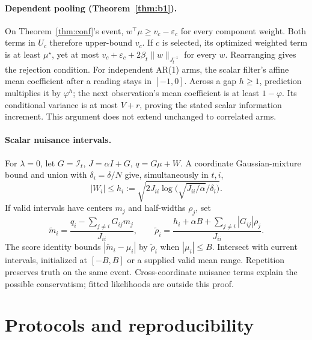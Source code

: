 \documentclass[sigconf,review,anonymous]{acmart}
\newcommand{\I}{\mathcal{I}}
\begin{document}
\paragraph{Dependent pooling (Theorem~\ref{thm:b1}).}
On Theorem~\ref{thm:conf}'s event, $w^\top\mu\ge v_c-\varepsilon_c$ for every component weight. Both terms in $U_c$ therefore upper-bound $v_c$. If $c$ is selected, its optimized weighted term is at least $\mu^\star$, yet at most $v_c+\varepsilon_c+2\beta_t\|w\|_{J_t^{-1}}$ for every $w$. Rearranging gives the rejection condition. For independent AR(1) arms, the scalar filter's affine mean coefficient after a reading stays in $[-1,0]$. Across a gap $h\ge1$, prediction multiplies it by $\varphi^h$; the next observation's mean coefficient is at least $1-\varphi$. Its conditional variance is at most $V+r$, proving the stated scalar information increment. This argument does not extend unchanged to correlated arms.

\paragraph{Scalar nuisance intervals.}
For $\lambda=0$, let $G=\I_t$, $J=\alpha I+G$, $q=G\mu+W$. A coordinate Gaussian-mixture bound and union with $\delta_i=\delta/N$ give, simultaneously in $t,i$,
\[
|W_i|\le h_i:=\sqrt{2J_{ii}\log\big(\sqrt{J_{ii}/\alpha}/\delta_i\big)}.
\]
If valid intervals have centers $m_j$ and half-widths $\rho_j$, set
\[
\widetilde m_i=\frac{q_i-\sum_{j\ne i}G_{ij}m_j}{J_{ii}},\qquad
\widetilde\rho_i=\frac{h_i+\alpha B+\sum_{j\ne i}|G_{ij}|\rho_j}{J_{ii}}.
\]
The score identity bounds $|\widetilde m_i-\mu_i|$ by $\widetilde\rho_i$ when $|\mu_i|\le B$. Intersect with current intervals, initialized at $[-B,B]$ or a supplied valid mean range. Repetition preserves truth on the same event. Cross-coordinate nuisance terms explain the possible conservatism; fitted likelihoods are outside this proof.

\section{Protocols and reproducibility}\label{app:data}
\end{document}
